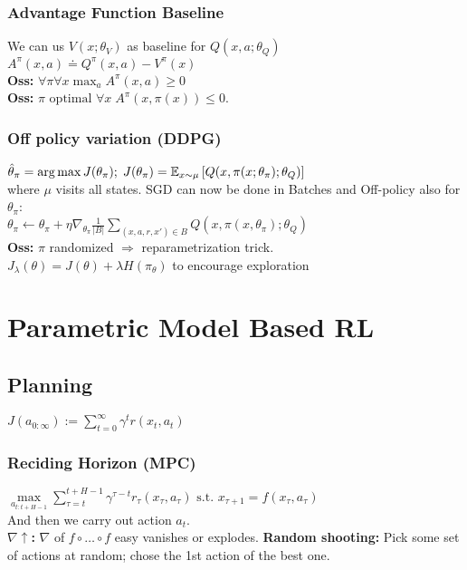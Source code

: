 \subsubsection{Advantage Function Baseline}
We can us $V(x;\theta_V)$ as baseline for $Q(x,a;\theta_Q)$\\
$A^\pi(x,a) \doteq Q^\pi(x,a)-V^\pi(x)$\\
\textbf{Oss:} $\forall\pi \forall x \max_a A^\pi(x,a)\geq 0$\\
\textbf{Oss:} $\pi \text{ optimal } \forall x  \;A^\pi(x,\pi(x))\leq 0$.

\subsubsection{Off policy variation (DDPG)}
{\scriptsize $\hat{\theta}_\pi = \operatorname*{arg\,max} J(\theta_\pi); \; J(\theta_\pi)=\mathbb{E}_{x\sim\mu}\left[Q(x,\pi(x;\theta_\pi);\theta_Q)\right]$}\\
where $\mu$ visits all states. SGD can now be done in Batches and Off-policy also for $\theta_\pi$:\\
$\theta_\pi \gets \theta_\pi + \eta \nabla_{\theta_\pi} \frac{1}{|B|}\sum_{(x,a,r,x')\in B}Q(x,\pi(x,\theta_\pi);\theta_Q)$\\
\textbf{Oss:}
$\pi$ randomized $\Rightarrow$ reparametrization trick.\\
$J_\lambda (\theta) = J(\theta) + \lambda H(\pi_\theta)$ to encourage exploration


\section{Parametric Model Based RL}


\subsection{Planning}
$J(a_{0:\infty}) := \sum_{t=0}^\infty \gamma^t r(x_t,a_t)$

\subsubsection{Reciding Horizon (MPC)}
$\max\limits_{a_{t:t+H-1}}\sum_{\tau = t}^{t+H-1}\gamma^{\tau - t}r_\tau(x_\tau, a_\tau) \text{ s.t. } x_{\tau + 1} = f(x_\tau, a_\tau)$\\
And then we carry out action $a_t$.\\
\textbf{$\nabla \uparrow$:} $\nabla$ of $f\circ \dots \circ f$ easy vanishes or explodes.
\textbf{Random shooting:} Pick some set of actions at random; chose the 1st action of the best one.


